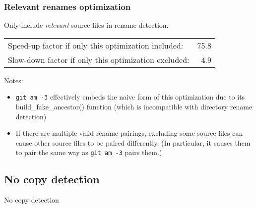 \documentclass[compress,t]{beamer}
\begin{document}
\begin{frame}
  \frametitle{Relevant renames optimization}

  Only include \textit{relevant} source files in rename detection.

  \pause
  \vspace*{\baselineskip}
  \begin{tabular}{lr}
    Speed-up factor if only this optimization included:  & 75.8 \\
    Slow-down factor if only this optimization excluded: & 4.9
  \end{tabular}

  \vspace*{2\baselineskip}
  \pause
  {\scriptsize
  Notes:
  \begin{itemize}
    \item \texttt{git am -3} effectively embeds the naive form of this
          optimization due to its build\_fake\_ancestor() function
          \pause
          (which is incompatible with directory rename detection)
          \pause
    \item If there are multiple valid rename pairings, excluding some source
          files can cause other source files to be paired differently.  (In
          particular, it causes them to pair the same way as
          \texttt{git am -3} pairs them.)\\
          \pause
          \vspace*{\baselineskip}
  \end{itemize}
  }

\end{frame}

\subsection[No Copy]{No copy detection}

\begin{frame}
  \vfill
  \vspace*{2\baselineskip}
  {\Huge
  \begin{center}No copy detection\end{center}
  }
  \vfill
\end{frame}
\end{document}
